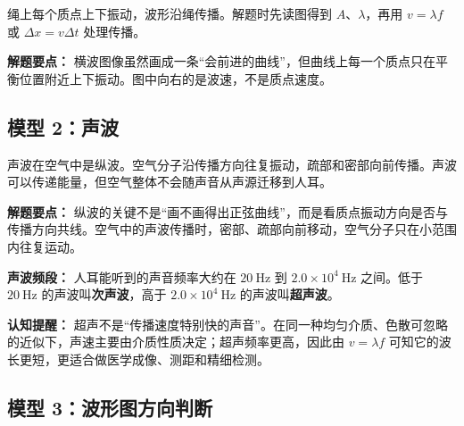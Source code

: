绳上每个质点上下振动，波形沿绳传播。解题时先读图得到 $A$、$\lambda$，再用 $v=\lambda f$ 或 $\Delta x=v\Delta t$ 处理传播。

\begin{center}


\label{fig:wave-rope-model}
\end{center}

\textbf{解题要点：} 横波图像虽然画成一条“会前进的曲线”，但曲线上每一个质点只在平衡位置附近上下振动。图中向右的是波速，不是质点速度。

\subsection*{模型 2：声波}

声波在空气中是纵波。空气分子沿传播方向往复振动，疏部和密部向前传播。声波可以传递能量，但空气整体不会随声音从声源迁移到人耳。

\begin{center}


\label{fig:sound-wave-model}
\end{center}

\textbf{解题要点：} 纵波的关键不是“画不画得出正弦曲线”，而是看质点振动方向是否与传播方向共线。空气中的声波传播时，密部、疏部向前移动，空气分子只在小范围内往复运动。

\textbf{声波频段：} 人耳能听到的声音频率大约在 $20\ \mathrm{Hz}$ 到 $2.0\times10^4\ \mathrm{Hz}$ 之间。低于 $20\ \mathrm{Hz}$ 的声波叫\textbf{次声波}，高于 $2.0\times10^4\ \mathrm{Hz}$ 的声波叫\textbf{超声波}。

\begin{center}


\label{fig:sound-frequency-bands}
\end{center}

\textbf{认知提醒：} 超声不是“传播速度特别快的声音”。在同一种均匀介质、色散可忽略的近似下，声速主要由介质性质决定；超声频率更高，因此由 $v=\lambda f$ 可知它的波长更短，更适合做医学成像、测距和精细检测。

\subsection*{模型 3：波形图方向判断}

